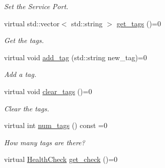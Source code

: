 \begin{DoxyCompactItemize}
\begin{DoxyCompactList}\small\item\em Set the Service Port. \end{DoxyCompactList}\item 
\hypertarget{classServiceInterface_afdc1ce12ef5ff09cf82e3d0f8ea7724a}{virtual std\-::vector$<$ std\-::string $>$ \hyperlink{classServiceInterface_afdc1ce12ef5ff09cf82e3d0f8ea7724a}{get\-\_\-tags} ()=0}\label{classServiceInterface_afdc1ce12ef5ff09cf82e3d0f8ea7724a}

\begin{DoxyCompactList}\small\item\em Get the tags. \end{DoxyCompactList}\item 
\hypertarget{classServiceInterface_ac8b80c9301fa04ea295acecd88b9cc42}{virtual void \hyperlink{classServiceInterface_ac8b80c9301fa04ea295acecd88b9cc42}{add\-\_\-tag} (std\-::string new\-\_\-tag)=0}\label{classServiceInterface_ac8b80c9301fa04ea295acecd88b9cc42}

\begin{DoxyCompactList}\small\item\em Add a tag. \end{DoxyCompactList}\item 
\hypertarget{classServiceInterface_a3e27c216421be0e92984b07a095f1279}{virtual void \hyperlink{classServiceInterface_a3e27c216421be0e92984b07a095f1279}{clear\-\_\-tags} ()=0}\label{classServiceInterface_a3e27c216421be0e92984b07a095f1279}

\begin{DoxyCompactList}\small\item\em Clear the tags. \end{DoxyCompactList}\item 
\hypertarget{classServiceInterface_aad0434e39242a47048659a1243fab46e}{virtual int \hyperlink{classServiceInterface_aad0434e39242a47048659a1243fab46e}{num\-\_\-tags} () const =0}\label{classServiceInterface_aad0434e39242a47048659a1243fab46e}

\begin{DoxyCompactList}\small\item\em How many tags are there? \end{DoxyCompactList}\item 
\hypertarget{classServiceInterface_afa5e0a43120dcd89dfcf7ae8aa086217}{virtual \hyperlink{structHealthCheck}{Health\-Check} \hyperlink{classServiceInterface_afa5e0a43120dcd89dfcf7ae8aa086217}{get\-\_\-check} ()=0}\label{classServiceInterface_afa5e0a43120dcd89dfcf7ae8aa086217}


\end{DoxyCompactItemize}
